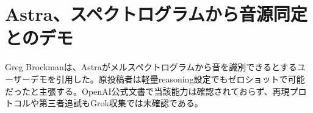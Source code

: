 \section{Astra、スペクトログラムから音源同定とのデモ}
Greg Brockmanは、Astraがメルスペクトログラムから音を識別できるとするユーザーデモを引用した。原投稿者は軽量reasoning設定でもゼロショットで可能だったと主張する。OpenAI公式文書で当該能力は確認されておらず、再現プロトコルや第三者追試もGrok収集では未確認である。
